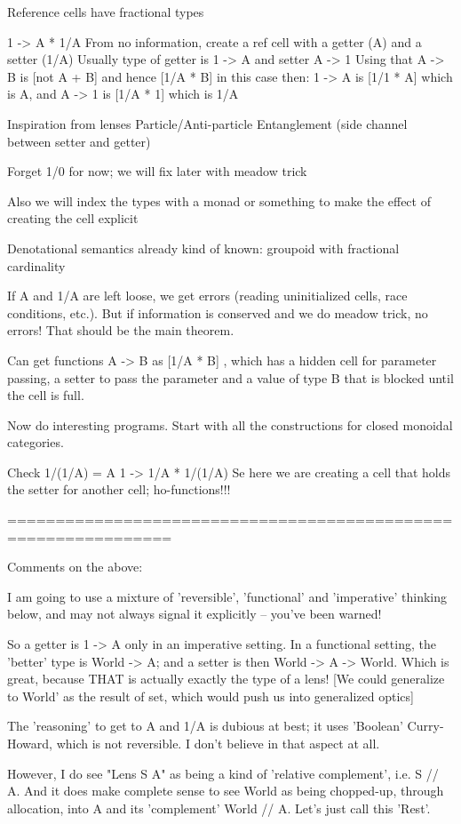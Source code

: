 
Reference cells have fractional types

1 -> A * 1/A
From no information, create a ref cell with a getter (A) and a setter (1/A)
Usually type of getter is 1 -> A and setter A -> 1
Using that A -> B is [not A + B] and hence [1/A * B] in this case then:
1 -> A is [1/1 * A] which is A, and
A -> 1 is [1/A * 1] which is 1/A

Inspiration from lenses
Particle/Anti-particle
Entanglement (side channel between setter and getter)

Forget 1/0 for now; we will fix later with meadow trick

Also we will index the types with a monad or something to make the effect of creating the cell explicit

Denotational semantics already kind of known: groupoid with fractional cardinality

If A and 1/A are left loose, we get errors (reading uninitialized cells, race conditions, etc.). But if information is conserved and we do meadow trick, no errors! That should be the main theorem.

Can get functions A -> B as [1/A * B] , which has a hidden cell for parameter passing, a setter to pass the parameter and a value of type B that is blocked until the cell is full.

Now do interesting programs. Start with all the constructions for closed monoidal categories.

Check 1/(1/A) = A
1 -> 1/A * 1/(1/A)
Se here we are creating a cell that holds the setter for another cell; ho-functions!!!


===============================================================

Comments on the above:

I am going to use a mixture of 'reversible', 'functional' and 'imperative' thinking below,
and may not always signal it explicitly -- you've been warned!

So a getter is 1 -> A only in an imperative setting. In a functional setting, the 'better' type
is World -> A; and a setter is then World -> A -> World. Which is great, because THAT is
actually exactly the type of a lens! [We could generalize to World' as the result of set,
which would push us into generalized optics]

The 'reasoning' to get to A and 1/A is dubious at best; it uses 'Boolean' Curry-Howard,
which is not reversible. I don't believe in that aspect at all.

However, I do see "Lens S A" as being a kind of 'relative complement', i.e. S // A.
And it does make complete sense to see World as being chopped-up, through allocation, into
A and its 'complement' World // A. Let's just call this 'Rest'.

